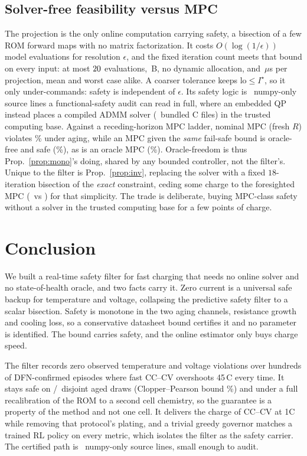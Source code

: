 \documentclass[conference]{IEEEtran}
\newcommand{\SI}[2]{#1\,#2}
\newcommand{\degreeCelsius}{\textdegree C}
\begin{document}
\subsection{Solver-free feasibility versus MPC}\label{sec:solver}
The projection is the only online computation carrying safety, a bisection of a few ROM forward maps
with no matrix factorization. It costs $O(\log(1/\epsilon))$ model evaluations for resolution
$\epsilon$, and the fixed iteration count meets that bound on every input: at most
$20$ evaluations, \SI{\filterMemB}{B}, no dynamic allocation, and
\SI{\filterMeanUs}{$\mu$s} per projection, mean and worst case alike. A coarser tolerance keeps
$\mathrm{lo}\le I^\star$, so it only under-commands: safety is independent of $\epsilon$. Its safety logic is \filterSloc\ numpy-only source lines a
functional-safety audit can read in full, where an embedded QP instead places a compiled ADMM solver
(\qpTcbFiles\ bundled C files) in the trusted computing base. Against a receding-horizon MPC ladder,
nominal MPC (fresh $R$) violates \mpcNomViol\% under aging, while an MPC given the \emph{same}
fail-safe bound is oracle-free and safe (\mpcBoundedViol\%), as is an oracle MPC (\mpcOracleViol\%).
Oracle-freedom is thus Prop.~\ref{prop:mono}'s doing, shared by any bounded controller, not the
filter's. Unique to the filter is Prop.~\ref{prop:inv}, replacing the solver with a fixed
$18$-iteration bisection of the \emph{exact} constraint, ceding some charge to the foresighted MPC
(\mpcOursSoc\ vs \mpcBoundedSoc) for that simplicity. The trade is deliberate, buying MPC-class safety
without a solver in the trusted computing base for a few points of charge.

\section{Conclusion}
We built a real-time safety filter for fast charging that needs no online solver and no state-of-health
oracle, and two facts carry it. Zero current is a universal safe backup for temperature and voltage,
collapsing the predictive safety filter to a scalar bisection. Safety is monotone in the two aging
channels, resistance growth and cooling loss, so a conservative datasheet bound certifies it and no
parameter is identified. The bound carries safety, and the online estimator only buys charge speed.

The filter records zero observed temperature and voltage violations over
hundreds of DFN-confirmed episodes where fast CC--CV overshoots \SI{45}{\degreeCelsius} every time.
It stays safe on \valSafe/\valN\ disjoint aged draws (Clopper--Pearson bound \valCP\%) and under a full
recalibration of the ROM to a second cell chemistry, so the guarantee is a property of the method and
not one cell. It delivers the charge of CC--CV at 1C while removing that protocol's plating, and a
trivial greedy governor matches a trained RL policy on every metric, which isolates the filter as the
safety carrier. The certified path is \filterSloc\ numpy-only source lines, small enough to audit.
\end{document}
